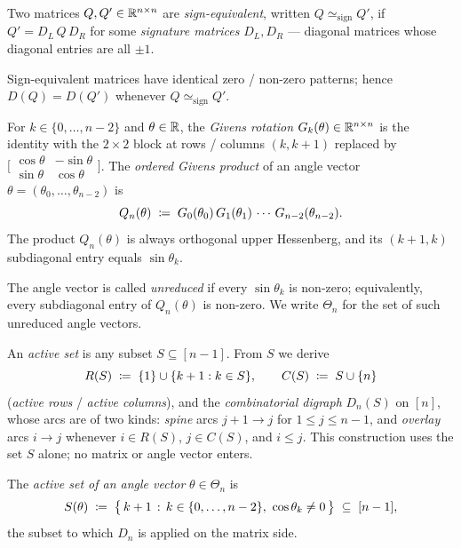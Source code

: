 \begin{definition}\label{def:sign}
Two matrices $Q, Q' \in \mathbb{R}^{n \times n}$ are \emph{sign-equivalent},
written $Q \simeq_{\mathrm{sign}} Q'$, if $Q' = D_L\, Q\, D_R$ for some
\emph{signature matrices} $D_L, D_R$ --- diagonal matrices whose diagonal
entries are all $\pm 1$.
\end{definition}

\begin{corollary}\label{cor:sign-support}
Sign-equivalent matrices have identical zero / non-zero patterns; hence
$D(Q) = D(Q')$ whenever $Q \simeq_{\mathrm{sign}} Q'$.
\end{corollary}

\begin{definition}\label{def:givens}
For $k \in \{0, \dots, n-2\}$ and $\theta \in \mathbb{R}$, the \emph{Givens rotation}
$G_k(\theta) \in \mathbb{R}^{n \times n}$ is the identity with the $2 \times 2$
block at rows / columns $(k, k{+}1)$ replaced by
$\bigl[\begin{smallmatrix}\cos\theta & -\sin\theta\\ \sin\theta & \cos\theta\end{smallmatrix}\bigr]$.
The \emph{ordered Givens product} of an angle vector $\theta = (\theta_0,
\dots, \theta_{n-2})$ is
\[
  Q_n(\theta) \;\coloneqq\; G_0(\theta_0)\, G_1(\theta_1)\,\cdots\,G_{n-2}(\theta_{n-2}).
\]
The product $Q_n(\theta)$ is always orthogonal upper Hessenberg, and its
$(k{+}1, k)$ subdiagonal entry equals $\sin\theta_k$.
\end{definition}

The angle vector is called \emph{unreduced} if every $\sin\theta_k$ is
non-zero; equivalently, every subdiagonal entry of $Q_n(\theta)$ is
non-zero. We write $\Theta_n$ for the set of such unreduced angle vectors.

\begin{definition}\label{def:active-set}
An \emph{active set} is any subset $S \subseteq [n-1]$. From $S$ we derive
\[
  R(S) \;\coloneqq\; \{1\} \cup \{k+1 : k \in S\}, \qquad
  C(S) \;\coloneqq\; S \cup \{n\}
\]
(\emph{active rows} / \emph{active columns}), and the \emph{combinatorial
digraph} $D_n(S)$ on $[n]$, whose arcs are of two kinds: \emph{spine} arcs
$j+1 \to j$ for $1 \le j \le n-1$, and \emph{overlay} arcs $i \to j$ whenever
$i \in R(S)$, $j \in C(S)$, and $i \le j$. This construction uses the set $S$
alone; no matrix or angle vector enters.

The \emph{active set of an angle vector} $\theta \in \Theta_n$ is
\[
  S(\theta) \;\coloneqq\; \bigl\{\, k+1 \,:\, k \in \{0, \dots, n-2\},\ \cos\theta_k \ne 0\,\bigr\} \;\subseteq\; [n-1],
\]
the subset to which $D_n$ is applied on the matrix side.
\end{definition}

